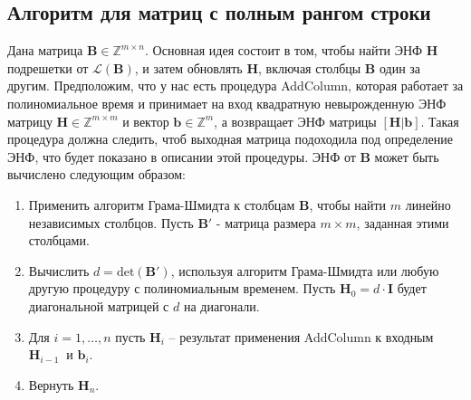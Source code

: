 \begin{algorithmic}

	
	\EndFor
	
\EndFor
\end{algorithmic}

\subsection{Алгоритм для матриц с полным рангом строки}

Дана матрица $ \mathbf{B} \in \mathbb{Z}^{m \times n} $. Основная идея состоит в том, чтобы найти ЭНФ $ \mathbf{H} $ подрешетки от $ \mathcal{L}(\mathbf{B}) $, и затем обновлять $ \mathbf{H} $, включая столбцы $ \mathbf{B} $ один за другим. Предположим, что у нас есть процедура AddColumn, которая работает за полиномиальное время и принимает на вход квадратную невырожденную ЭНФ матрицу $ \mathbf{H} \in \mathbb{Z}^{m \times m} $ и вектор $ \mathbf{b} \in \mathbb{Z}^{m}$, а возвращает ЭНФ матрицы $ [\mathbf{H|b}] $. Такая процедура должна следить, чтоб выходная матрица подоходила под определение ЭНФ, что будет показано в описании этой процедуры. ЭНФ от $ \mathbf{B} $ может быть вычислено следующим образом:
\begin{enumerate}
\item Применить алгоритм Грама-Шмидта к столбцам $ \mathbf{B} $, чтобы найти $ m $ линейно независимых столбцов. Пусть $ \mathbf{B}' $ - матрица размера $ m \times m $, заданная этими столбцами.
\item Вычислить $ d=\mathrm{det}(\mathbf{B}') $, используя алгоритм Грама-Шмидта или любую другую процедуру с полиномиальным временем. Пусть $ \mathbf{H}_0=d \cdot \mathbf{I} $ будет диагональной матрицей с $ d $ на диагонали.
\item Для $ i=1, \ldots ,n $ пусть $ \mathbf{H}_i $ -- результат применения AddColumn к входным $  \mathbf{H}_{i-1}\ $ и $ \mathbf{b}_i $.
\item Вернуть $ \mathbf{H}_n $.
\end{enumerate}

